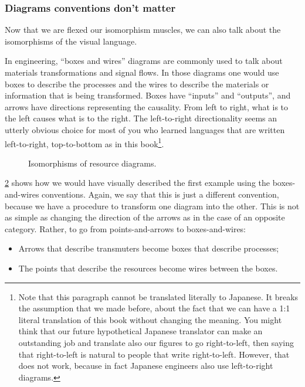 \begin{figure}[h!]
  \begin{center}
  \end{center}
  \caption{\label{fig:inverted_2}}
\end{figure}

\subsubsection{Diagrams conventions don't matter}

Now that we are flexed our isomorphism muscles, we can also talk about the isomorphisms
of the visual language.

In engineering, ``boxes and wires'' diagrams are commonly used to talk about
materials transformations and signal flows. In those diagrams one would use
boxes to describe the processes and the wires to describe the materials or information
that is being transformed. Boxes have ``inputs'' and ``outputs'', and arrows have
directions representing the causality. From left to right, what is to the left causes what is to the right.
The left-to-right directionality seems an utterly obvious choice for most of you
who learned languages that are written left-to-right, top-to-bottom as in this book\footnote{
  Note that this paragraph cannot be translated literally to Japanese. It breaks the assumption
  that we made before, about the fact that we can have a 1:1 literal translation of this book
  without changing the meaning. You might think that our future hypothetical Japanese
  translator can make an outstanding job and translate also our figures to go right-to-left,
  then saying that right-to-left is natural to people that write right-to-left. However,
  that does not work, because in fact Japanese engineers also use left-to-right diagrams.}.

\begin{figure}[h!]
  \centering
  
  \caption{Isomorphisms of resource diagrams. \label{fig:isodiagrams} }
\end{figure}


\cref{fig:isodiagrams} shows how we would have visually described
the first example using the boxes-and-wires conventions.
Again, we say that this is just a different convention, because
we have a procedure to transform one diagram into the other.
This is not as simple as changing the direction of the arrows as in the case of an
opposite category. Rather, to go from points-and-arrows to boxes-and-wires:
\begin{itemize}
  \item Arrows that describe transmuters become boxes that describe processes;
  \item The points that describe the resources become wires between the boxes.
\end{itemize}




\let\mora\oldmora
\let\morb\oldmorb
\let\morc\oldmorc

\let\Obja\oldObja
\let\Objb\oldObjb
\let\Objc\oldObjc
\let\Objd\oldObjd

\let\Ob\oldOb

\let\Hom\oldHom
